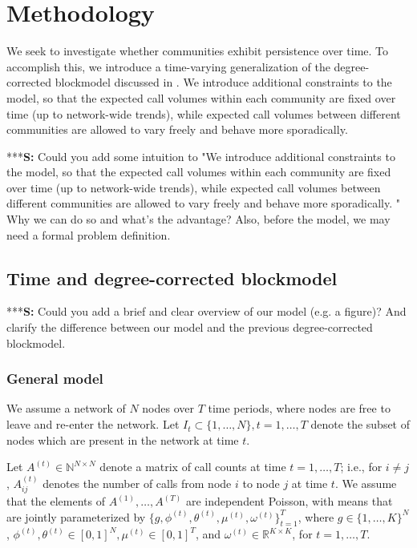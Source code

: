 \documentclass{article}
\begin{document}
\section{Methodology}

We seek to investigate whether communities exhibit persistence over time. To accomplish this, we introduce a time-varying generalization of the degree-corrected blockmodel discussed in \cite{karrer2011stochastic}. We introduce additional constraints to the model, so that the expected call volumes within each community are fixed over time (up to network-wide trends), while expected call volumes between different communities are allowed to vary freely and behave more sporadically. 

***\textbf{S:} Could you add some intuition to "We introduce additional constraints to the model, so that the expected call volumes within each community are fixed over time (up to network-wide trends), while expected call volumes between different communities are allowed to vary freely and behave more sporadically. " Why we can do so and what's the advantage? Also, before the model, we may need a formal problem definition. 

\subsection{Time and degree-corrected blockmodel}
***\textbf{S:} Could you add a brief and clear overview of our model (e.g. a figure)? And clarify the difference between our model and the previous degree-corrected blockmodel.
\subsubsection{General model}
 We assume a network of $N$ nodes over $T$ time periods, where nodes are free to leave and re-enter the network. Let $I_t \subset \{1,\ldots,N\}, t=1,\ldots,T$ denote the subset of nodes which are present in the network at time $t$.

Let $A^{(t)} \in \mathbb{N}^{N \times N}$ denote a matrix of call counts at time $t=1,\ldots,T$; i.e., for $i \neq j$, $A_{ij}^{(t)}$ denotes the number of calls from node $i$ to node $j$ at time $t$. We assume that the elements of $A^{(1)},\ldots,A^{(T)}$ are independent Poisson, with means that are jointly parameterized  by $ \{g,\phi^{(t)},\theta^{(t)},\mu^{(t)},\omega^{(t)}\}_{t=1}^T$, where $g \in \{1,\ldots,K\}^N$, $\phi^{(t)}, \theta^{(t)} \in [0,1]^N, \mu^{(t)} \in [0,1]^T$, and  $\omega^{(t)} \in \mathbb{R}^{K \times K}$, for $t=1,\ldots,T$. 
\end{document}
